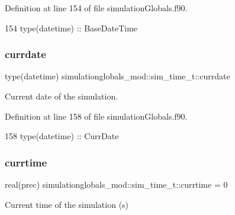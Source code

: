 Definition at line 154 of file simulation\+Globals.\+f90.


\begin{DoxyCode}
154         \textcolor{keywordtype}{type}(datetime)  :: BaseDateTime
\end{DoxyCode}
\mbox{\label{structsimulationglobals__mod_1_1sim__time__t_a547910a1c56076286ad768d6862725a5}} 
\subsubsection{\texorpdfstring{currdate}{currdate}}
{\footnotesize\ttfamily type(datetime) simulationglobals\+\_\+mod\+::sim\+\_\+time\+\_\+t\+::currdate\hspace{0.3cm}{\ttfamily [private]}}



Current date of the simulation. 



Definition at line 158 of file simulation\+Globals.\+f90.


\begin{DoxyCode}
158         \textcolor{keywordtype}{type}(datetime)  :: CurrDate
\end{DoxyCode}
\mbox{\label{structsimulationglobals__mod_1_1sim__time__t_aef4f2cbfeae48936accb80bcc819b778}} 
\subsubsection{\texorpdfstring{currtime}{currtime}}
{\footnotesize\ttfamily real(prec) simulationglobals\+\_\+mod\+::sim\+\_\+time\+\_\+t\+::currtime = 0\hspace{0.3cm}{\ttfamily [private]}}



Current time of the simulation (s) 



